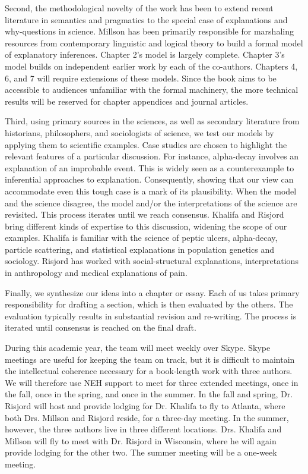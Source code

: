 \documentclass{article}[11pt]
\begin{document}
Second, the methodological novelty of the work has been to extend recent literature in semantics and pragmatics to the special case of explanations and why-questions in science. Millson has been primarily responsible for marshaling resources from contemporary linguistic and logical theory to build a formal model of explanatory inferences. Chapter 2's model is largely complete. Chapter 3's model builds on independent earlier work by each of the co-authors. Chapters 4, 6, and 7 will require extensions of these models. Since the book aims to be accessible to audiences unfamiliar with the formal machinery, the more technical results will be reserved for chapter appendices and journal articles.

Third, using primary sources in the sciences, as well as secondary literature from historians, philosophers, and sociologists of science, we test our models by applying them to scientific examples. Case studies are chosen to highlight the relevant features of a particular discussion. For instance, alpha-decay involves an explanation of an improbable event. This is widely seen as a counterexample to inferential approaches to explanation. Consequently, showing that our view can accommodate even this tough case is a mark of its plausibility. When the model and the science disagree, the model and/or the interpretations of the science are revisited. This process iterates until we reach consensus.  Khalifa and Risjord bring different kinds of expertise to this discussion, widening the scope of our examples. Khalifa is familiar with the science of peptic ulcers, alpha-decay, particle scattering, and statistical explanations in population genetics and sociology. Risjord has worked with social-structural explanations, interpretations in anthropology and medical explanations of pain.

Finally, we synthesize our ideas into a chapter or essay. Each of us takes primary responsibility for drafting a section, which is then evaluated by the others.  The evaluation typically results in substantial revision and re-writing. The process is iterated until consensus is reached on the final draft. 


During this academic year, the team will meet weekly over Skype.  Skype meetings are useful for keeping the team on track, but it is difficult to maintain the intellectual coherence necessary for a book-length work with three authors.  We will therefore use NEH support to meet for three extended meetings, once in the fall, once in the spring, and once in the summer. In the fall and spring, Dr. Risjord will host and provide lodging for Dr. Khalifa to fly to Atlanta, where both Drs. Millson and Risjord reside, for a three-day meeting.  In the summer, however, the three authors live in three different locations. Drs. Khalifa and Millson will fly to meet with Dr. Risjord in Wisconsin, where he will again provide lodging for the other two. The summer meeting will be a one-week meeting.
\end{document}
